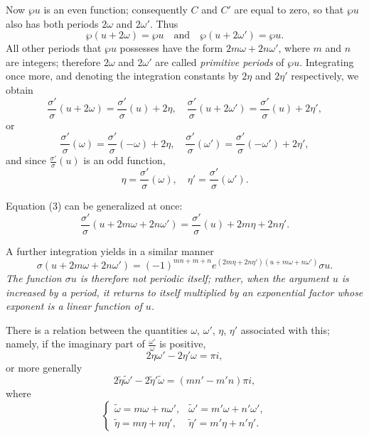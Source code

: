 \documentclass[12pt]{article}
\begin{document}
Now $\wp u$ is an even function; consequently $C$ and $C'$ are equal to zero, so that $\wp u$ also has both periods $2\omega$ and $2\omega'$. Thus
\begin{equation}
\wp(u+2\omega) = \wp u \quad \text{and} \quad \wp(u+2\omega') = \wp u.
\end{equation}
All other periods that $\wp u$ possesses have the form $2m\omega + 2n\omega'$, where $m$ and $n$ are integers; therefore $2\omega$ and $2\omega'$ are called \emph{primitive periods} of $\wp u$.
Integrating once more, and denoting the integration constants by $2\eta$ and $2\eta'$ respectively, we obtain
\begin{equation}
\frac{\sigma'}{\sigma}(u+2\omega) = \frac{\sigma'}{\sigma}(u) + 2\eta, \quad \frac{\sigma'}{\sigma}(u+2\omega') = \frac{\sigma'}{\sigma}(u) + 2\eta',
\end{equation}
or
\begin{equation*}
\frac{\sigma'}{\sigma}(\omega) = \frac{\sigma'}{\sigma}(-\omega) + 2\eta, \quad \frac{\sigma'}{\sigma}(\omega') = \frac{\sigma'}{\sigma}(-\omega') + 2\eta',
\end{equation*}
and since $\frac{\sigma'}{\sigma}(u)$ is an odd function,
\begin{equation}
\eta = \frac{\sigma'}{\sigma}(\omega), \quad \eta' = \frac{\sigma'}{\sigma}(\omega').
\end{equation}

Equation (3) can be generalized at once:
\begin{equation}
\tag{3$^a$.} \frac{\sigma'}{\sigma}(u+2m\omega+2n\omega') = \frac{\sigma'}{\sigma}(u) + 2m\eta + 2n\eta'.
\end{equation}

A further integration yields in a similar manner
\begin{equation}
\sigma(u+2m\omega+2n\omega') = (-1)^{mn+m+n} e^{(2m\eta+2n\eta')(u+m\omega+n\omega')} \sigma u.
\end{equation}
\emph{The function $\sigma u$ is therefore not periodic itself; rather, when the argument $u$ is increased by a period, it returns to itself multiplied by an exponential factor whose exponent is a linear function of $u$.}

There is a relation between the quantities $\omega$, $\omega'$, $\eta$, $\eta'$ associated with this; namely, if the imaginary part of $\frac{\omega'}{\omega}$ is positive,
\begin{equation}
2\eta\omega' - 2\eta'\omega = \pi i,
\end{equation}
or more generally
\begin{equation}
\tag{6$^a$.} 2\tilde{\eta}\tilde{\omega}' - 2\tilde{\eta}'\tilde{\omega} = (mn' - m'n)\pi i,
\end{equation}
where
\begin{equation}
\begin{cases}
\tilde{\omega} = m\omega + n\omega', & \tilde{\omega}' = m'\omega + n'\omega',\\
\tilde{\eta} = m\eta + n\eta', & \tilde{\eta}' = m'\eta + n'\eta'.
\end{cases}
\end{equation}
\end{document}
